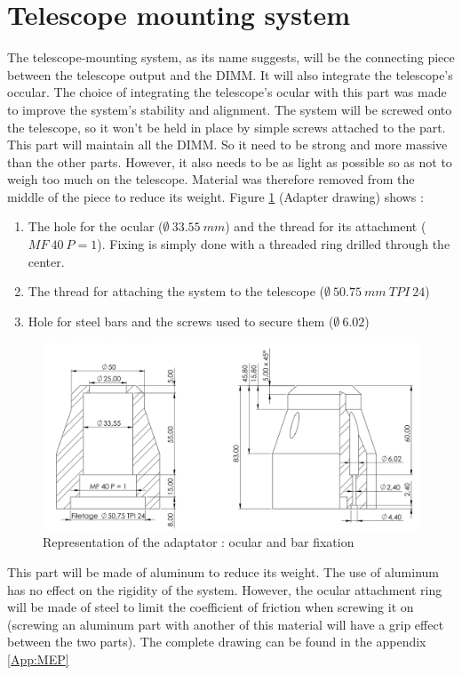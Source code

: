\section{Telescope mounting system}\label{sec:adaptator}
The telescope-mounting system, as its name suggests, will be the connecting piece between the telescope output and the DIMM. It will 
also integrate the telescope's occular. The choice of integrating the telescope's ocular with this part was made to improve the system's 
stability and alignment. The system will be screwed onto the telescope, so it won't be held in place by simple screws attached to 
the part. \newline
This part will maintain all the DIMM. So it need to be strong and more massive than the other parts. However, it also needs to be as 
light as possible so as not to weigh too much on the telescope. Material was therefore removed from the middle of the piece to reduce 
its weight.
\bigbreak
Figure \ref{fig:Mec_Adapter1} (Adapter drawing) shows :
\begin{enumerate}
    \item The hole for the ocular ($\emptyset\ 33.55\ mm$) and the thread for its attachment ($MF\ 40\ P=1$). Fixing is simply done 
    with a threaded ring drilled through the center.
    \item The thread for attaching the system to the telescope ($\emptyset\ 50.75\ mm\ TPI\ 24$)
    \item Hole for steel bars and the screws used to secure them ($\emptyset\ 6.02$)
\end{enumerate}
\begin{figure}[H]
    \centering
    \includegraphics[scale=0.6]{assets/figures/Mechanical Design/Dessin_Part1_adapter.png}
    \caption{Representation of the adaptator : ocular and bar fixation}
    \label{fig:Mec_Adapter1}
\end{figure}
This part will be made of aluminum to reduce its weight. The use of aluminum has no effect on the rigidity of the system. \newline
However, the ocular attachment ring will be made of steel to limit the coefficient of friction when screwing it on 
(screwing an aluminum part with another of this material will have a grip effect between the two parts).
\bigbreak
The complete drawing can be found in the appendix \ref{App:MEP}
\newpage
